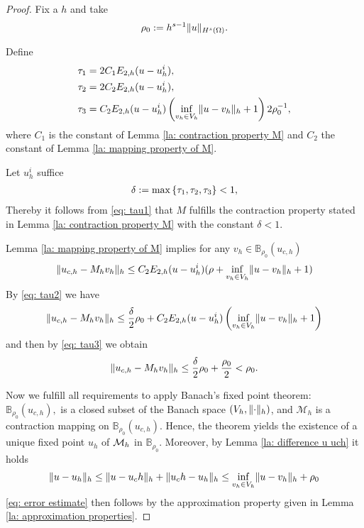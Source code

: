 \begin{proof}
	Fix a $h$ and take
	\begin{align}
		\rho_0:= h^{s-1} \lVert u \rVert_{H^{s}(\Omega)}. \label{eq: definition rho0}
	\end{align}
	
	Define 
	\begin{align}
		\tau_1 &= 2 C_1 E_{2,h}(u-u_h^i), \label{eq: tau1}\\
		\tau_2 & = 2 C_2 E_{2,h}(u-u_h^i), \label{eq: tau2}\\
		\tau_3 & = C_2 E_{2,h}(u-u_h^i) \left(\inf_{v_h \in V_h} \lVert u-v_h \rVert_{h}+1\right) 2 \rho_0^{-1} \label{eq: tau3},
	\end{align}
	where $C_1$ is the constant of Lemma \ref{la: contraction property M} and $C_2$ the constant of Lemma \ref{la: mapping property of M}. 
	
	Let $u_h^i$ suffice
	\begin{align}
		\delta := \operatorname{max} \left\{ \tau_1, \tau_2, \tau_3 \right\} < 1,
	\end{align}
	Thereby it follows from \eqref{eq: tau1} that $M$ fulfills the contraction property stated in Lemma \ref{la: contraction property M} with the constant $\delta<1$.
	
	Lemma \ref{la: mapping property of M} implies for any $v_h \in \mathbb{B}_{\rho_0}(u_{c,h})$
	 \[
	 	\lVert u_{c,h} - M_h v_h \rVert_{h} \leq 
	 		C_2 E_{2,h}(u - u^i_h) (\rho+ \inf_{v_h \in V_h} \lVert u-v_h \rVert_{h}+1) 
	 \]
	By \eqref{eq: tau2} we have 
	 \[
	 	\lVert u_{c,h} - M_h v_h \rVert_{h} \leq 
	 		\frac \delta 2 \rho_0 
	 			+ C_2  E_{2,h}(u - u^i_h) \left( \inf_{v_h \in V_h} \lVert u-v_h \rVert_{h}+1\right)
	 \]
	 and then by \eqref{eq: tau3} we obtain
	 \begin{align}
	 	\lVert u_{c,h} - M_h v_h \rVert_{h} \leq 
	 		\frac \delta 2 \rho_0 
	 		+ \frac {\rho_0} 2  < \rho_0. \label{eq: self mapping M}
	 \end{align} 
	 
	 Now we fulfill all requirements to apply Banach's fixed point theorem: $\mathbb{B}_{\rho_0}(u_{c,h}), $ is a closed subset of the Banach space $(V_h, \lVert \cdot \rVert_{h})$, and $\mathcal M_h$ is a contraction mapping on $ \mathbb{B}_{\rho_0}(u_{c,h})$. Hence, the theorem yields the existence of a unique fixed point $u_h$ of $\mathcal M_h$ in $\mathbb B_{\rho_0}$.
	 Moreover, by Lemma \ref{la: difference u uch} it holds
	 \begin{align}
	 	\lVert u-u_h \rVert_{h} \leq \lVert u-u_ch \rVert_{h} + \lVert u_ch - u_h \rVert_{h} \leq \inf_{v_h \in V_h} \lVert u-v_h \rVert_{h} +\rho_0 
	\end{align}
	\eqref{eq: error estimate} then follows by the approximation property given in Lemma \ref{la: approximation properties}.
	

\end{proof}
